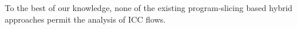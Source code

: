 To the best of our knowledge, none of the existing program-slicing based hybrid approaches \cite{rasthofer2016harvesting, backes2016r} permit the analysis of ICC flows.










